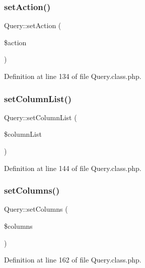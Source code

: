 \subsubsection{\texorpdfstring{set\+Action()}{setAction()}}
{\footnotesize\ttfamily Query\+::set\+Action (\begin{DoxyParamCaption}\item[{}]{\$action }\end{DoxyParamCaption})}



Definition at line 134 of file Query.\+class.\+php.

\mbox{\label{classQuery_a514b84890d27f9252a9002f562b17654}} 
\subsubsection{\texorpdfstring{set\+Column\+List()}{setColumnList()}}
{\footnotesize\ttfamily Query\+::set\+Column\+List (\begin{DoxyParamCaption}\item[{}]{\$column\+List }\end{DoxyParamCaption})}



Definition at line 144 of file Query.\+class.\+php.

\mbox{\label{classQuery_a2437f6f8524dfc487794270a11778388}} 
\subsubsection{\texorpdfstring{set\+Columns()}{setColumns()}}
{\footnotesize\ttfamily Query\+::set\+Columns (\begin{DoxyParamCaption}\item[{}]{\$columns }\end{DoxyParamCaption})}



Definition at line 162 of file Query.\+class.\+php.

\mbox{\label{classQuery_a5355ddd61a8e4dc129f5f3dd24d39bc9}} 

